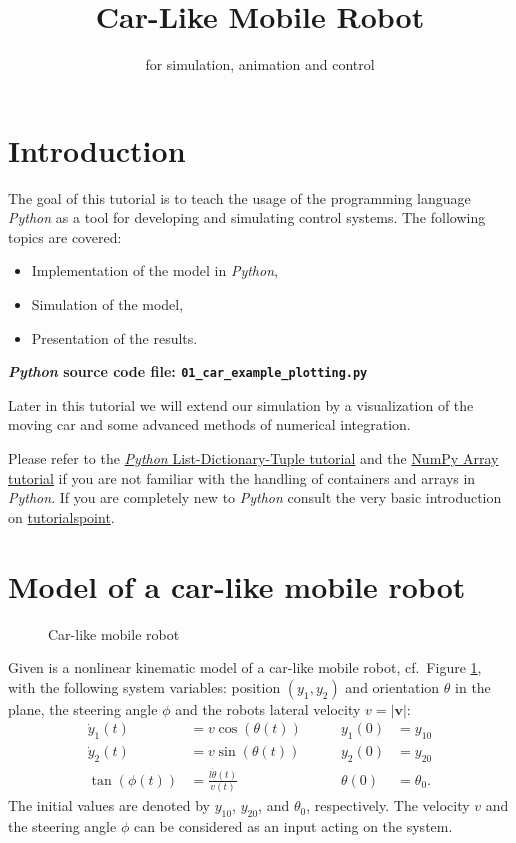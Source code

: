 \documentclass[a4paper,11pt,headings=standardclasses,parskip=half]{scrartcl}
\title{Car-Like Mobile Robot}
\subtitle{\py for simulation, animation and control}%
\author{}
\date{}
\newcommand{\py}{\emph{Python}\xspace}
\begin{document}
\maketitle%

\tableofcontents

\newpage

\section{Introduction}
The goal of this tutorial is to teach the usage of the programming language \py as a tool for developing and simulating control systems. The following topics are covered:
\begin{itemize}
\item Implementation of the model in \py,
\item Simulation of the model,
\item Presentation of the results.
\end{itemize}
\textbf{\py source code file: \texttt{01\_car\_example\_plotting.py}}

Later in this tutorial we will extend our simulation by a visualization of the moving car and some advanced methods of numerical integration.

Please refer to the \href{http://cs231n.github.io/python-numpy-tutorial/#python-containers}{\py List-Dictionary-Tuple tutorial} and the \href{http://cs231n.github.io/python-numpy-tutorial/#numpy}{NumPy Array tutorial} if you are not familiar with the handling of containers and arrays in \py. If you are completely new to \py consult the very basic introduction on \href{https://www.tutorialspoint.com/python/index.htm}{tutorialspoint}.

\section{Model of a car-like mobile robot}
\label{sec:model}
\begin{figure}[ht]
  \centering
  \def\svgwidth{0.7\textwidth}
  
  \caption{Car-like mobile robot}
  \label{fig:car}
\end{figure}
Given is a nonlinear kinematic model of a car-like mobile robot, cf.~Figure \ref{fig:car}, with the following system variables: position $(y_1, y_2)$ and orientation $\theta$ in the plane, the steering angle $\phi$ and the robots lateral velocity $v=\left| \mathbf{v} \right| $: 
\begin{subequations}\label{eq:syseq}
\begin{alignat}{2}
\dot{y}_1(t)&=v \cos (\theta(t)) &\qquad y_1(0) &= y_{10}\\
\dot{y}_2(t)&=v \sin (\theta(t)) &\qquad y_2(0) &= y_{20}\\
\tan(\phi(t)) &= \frac{l\dot{\theta}(t)}{v(t)} &\qquad \theta(0) &= \theta_{0}.
\end{alignat}
\end{subequations}
The initial values are denoted by $y_{10}$, $y_{20}$, and $\theta_0$, respectively. The velocity $v$ and the steering angle $\phi$ can be considered as an input acting on the system.
\end{document}
